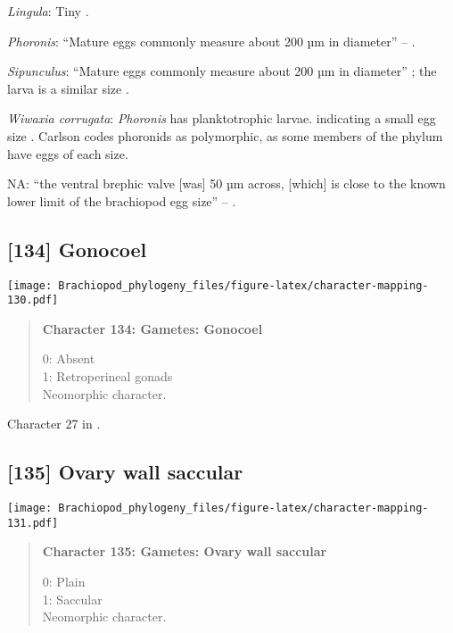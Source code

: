 \documentclass[openany]{book}
\theoremstyle{definition}
\theoremstyle{definition}
\theoremstyle{definition}
\theoremstyle{remark}
\begin{document}
\hypertarget{Lingula-coding-133}{}
\emph{Lingula}: Tiny \citep{Nielsen1966}.

\hypertarget{Phoronis-coding-133}{}
\emph{Phoronis}: ``Mature eggs commonly measure about 200 µm in
diameter'' -- \citet{Franzen1977}.

\hypertarget{Sipunculus-coding-133}{}
\emph{Sipunculus}: ``Mature eggs commonly measure about 200 µm in
diameter'' \citep{Franzen1977}; the larva is a similar size
\citep{Reed1982}.

\hypertarget{Wiwaxia_corrugata-coding-133}{}
\emph{Wiwaxia corrugata}: \emph{Phoronis} has planktotrophic larvae.
indicating a small egg size \citep{Ruppert2004Invertebratezoology}.
Carlson \citeyearpar{Carlson1995Phylogeneticrelationships} codes
phoronids as polymorphic, as some members of the phylum have eggs of
each size.

\hypertarget{NA-coding-133}{}
NA: ``the ventral brephic valve {[}was{]} 50 µm across, {[}which{]} is
close to the known lower limit of the brachiopod egg size'' --
\citet{Popov2009Earlyontogeny}.

\subsection*{{[}134{]} Gonocoel}\label{gonocoel}

\texttt{[image: Brachiopod\_phylogeny\_files/figure-latex/character-mapping-130.pdf]}

\begin{quote}
\textbf{Character 134: Gametes: Gonocoel}

0: Absent\\
1: Retroperineal gonads\\
Neomorphic character.
\end{quote}

Character 27 in \citet{Haszprunar1996}.

\subsection*{{[}135{]} Ovary wall saccular}\label{ovary-wall-saccular}

\texttt{[image: Brachiopod\_phylogeny\_files/figure-latex/character-mapping-131.pdf]}

\begin{quote}
\textbf{Character 135: Gametes: Ovary wall saccular}

0: Plain\\
1: Saccular\\
Neomorphic character.
\end{quote}
\end{document}
